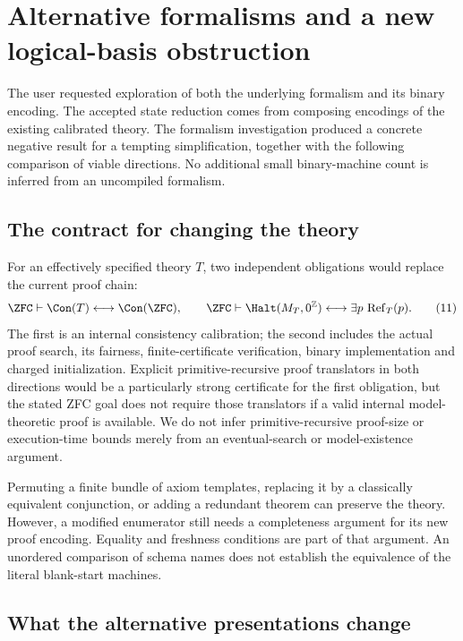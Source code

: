 \section{Alternative formalisms and a new logical-basis obstruction}
\label{sec:formalisms}

The user requested exploration of both the underlying formalism and its
binary encoding.  The accepted state reduction comes from composing
encodings of the existing calibrated theory.  The formalism investigation
produced a concrete negative result for a tempting simplification, together
with the following comparison of viable directions.  No additional small
binary-machine count is inferred from an uncompiled formalism.

\subsection{The contract for changing the theory}

For an effectively specified theory $T$, two independent obligations would
replace the current proof chain:
\[
 \ZFC\vdash\Con(T)\longleftrightarrow\Con(\ZFC),
 \qquad
 \ZFC\vdash\Halt(M_T,0^{\mathbb Z})
       \longleftrightarrow\exists p\,\operatorname{Ref}_T(p).
 \tag{11}
\]
The first is an internal consistency calibration; the second includes the
actual proof search, its fairness, finite-certificate verification, binary
implementation and charged initialization.  Explicit primitive-recursive
proof translators in both directions would be a particularly strong
certificate for the first obligation, but the stated ZFC goal does not
require those translators if a valid internal model-theoretic proof is
available.  We do not infer primitive-recursive proof-size or execution-time
bounds merely from an eventual-search or model-existence argument.

Permuting a finite bundle of axiom templates, replacing it by a classically
equivalent conjunction, or adding a redundant theorem can preserve the
theory.  However, a modified enumerator still needs a completeness argument
for its new proof encoding.  Equality and freshness conditions are part of
that argument.  An unordered comparison of schema names does not establish
the equivalence of the literal blank-start machines.

\subsection{What the alternative presentations change}

